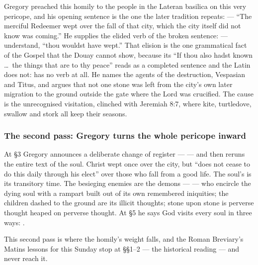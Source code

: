 \begin{witnessnote}
Gregory preached this homily to the people in the Lateran basilica on this
very pericope, and his opening sentence is the one the later tradition
repeats:  --- ``The merciful Redeemer
wept over the fall of that city, which the city itself did not know was
coming.'' He supplies the elided verb of the broken sentence:  --- understand, ``thou wouldst have
wept.'' That elision is the one grammatical fact of the Gospel that the Douay
cannot show, because its ``If thou also hadst known \dots\ the things
that are to thy peace'' reads as a completed sentence and the Latin does not:
 has no verb at all. He names the agents of the
destruction, Vespasian and Titus, and argues that not one stone was left from
the city's own later migration to the ground outside the gate where the Lord
was crucified. The cause is the unrecognised visitation, clinched with
Jeremiah 8:7, where kite, turtledove, swallow and stork all keep their seasons.
\end{witnessnote}

\subsubsection*{The second pass: Gregory turns the whole pericope inward}

At §3 Gregory announces a deliberate change of register ---  --- and then
reruns the entire text of the soul. Christ wept once over the city, but
``does not cease to do this daily through his elect'' over those who fall from
a good life. The soul's  is its transitory time. The
besieging enemies are the demons ---  --- who encircle the dying soul with
a rampart built out of its own remembered iniquities; the children dashed to
the ground are its illicit thoughts; stone upon stone is perverse thought
heaped on perverse thought. At §5 he says God visits every soul in three
ways: .

This second pass is where the homily's weight falls, and the Roman
Breviary's Matins lessons for this Sunday stop at §§1--2 --- the historical
reading --- and never reach it.


